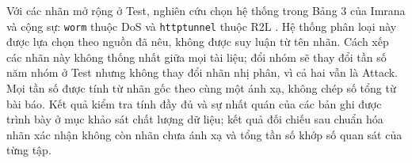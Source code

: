 Với các nhãn mở rộng ở Test, nghiên cứu chọn hệ thống trong Bảng 3 của Imrana và cộng sự: \texttt{worm} thuộc DoS và \texttt{httptunnel} thuộc R2L \cite{task2_imrana2022}. Hệ thống phân loại này được lựa chọn theo nguồn đã nêu, không được suy luận từ tên nhãn. Cách xếp các nhãn này không thống nhất giữa mọi tài liệu; đổi nhóm sẽ thay đổi tần số năm nhóm ở Test nhưng không thay đổi nhãn nhị phân, vì cả hai vẫn là Attack. Mọi tần số được tính từ nhãn gốc theo cùng một ánh xạ, không chép số tổng từ bài báo. Kết quả kiểm tra tính đầy đủ và sự nhất quán của các bản ghi được trình bày ở mục khảo sát chất lượng dữ liệu; kết quả đối chiếu sau chuẩn hóa nhãn xác nhận không còn nhãn chưa ánh xạ và tổng tần số khớp số quan sát của từng tập.
\FloatBarrier
